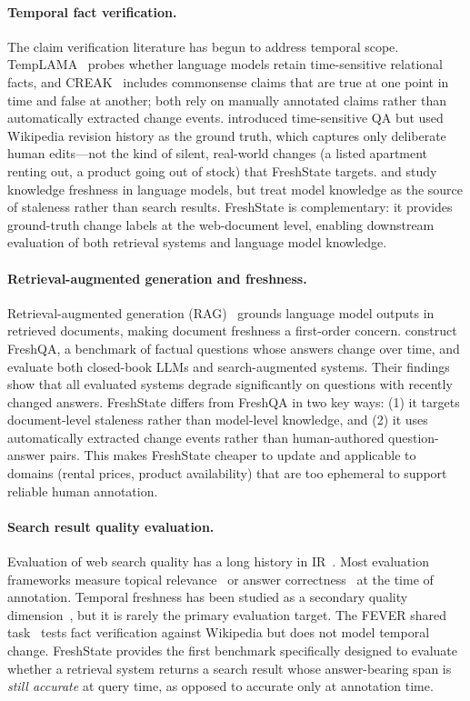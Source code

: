 \paragraph{Temporal fact verification.}
The claim verification literature has begun to address temporal scope.
TempLAMA~\citep{dhingra2022templama} probes whether language models retain
time-sensitive relational facts, and CREAK~\citep{onoe2021creak} includes commonsense
claims that are true at one point in time and false at another; both rely on manually
annotated claims rather than automatically extracted change events. \citet{chen2021timeqa}
introduced time-sensitive QA but used Wikipedia revision history as the ground
truth, which captures only deliberate human edits---not the kind of silent,
real-world changes (a listed apartment renting out, a product going out of stock)
that FreshState targets. \citet{kasner2023tabgenie} and \citet{shi2024freshllm}
study knowledge freshness in language models, but treat model knowledge as the
source of staleness rather than search results. FreshState is complementary:
it provides ground-truth change labels at the web-document level, enabling
downstream evaluation of both retrieval systems and language model knowledge.

\paragraph{Retrieval-augmented generation and freshness.}
Retrieval-augmented generation (RAG)~\citep{lewis2020rag} grounds language model
outputs in retrieved documents, making document freshness a first-order concern.
\citet{shi2024freshllm} construct FreshQA, a benchmark of factual questions whose
answers change over time, and evaluate both closed-book LLMs and search-augmented
systems. Their findings show that all evaluated systems degrade significantly on
questions with recently changed answers. FreshState differs from FreshQA in two
key ways: (1) it targets document-level staleness rather than model-level knowledge,
and (2) it uses automatically extracted change events rather than human-authored
question-answer pairs. This makes FreshState cheaper to update and applicable to
domains (rental prices, product availability) that are too ephemeral to support
reliable human annotation.

\paragraph{Search result quality evaluation.}
Evaluation of web search quality has a long history in IR~\citep{voorhees2005trec}.
Most evaluation frameworks measure topical relevance~\citep{craswell2021overview}
or answer correctness~\citep{kwiatkowski2019nq} at the time of annotation. Temporal
freshness has been studied as a secondary quality dimension~\citep{adar2009web}, but
it is rarely the primary evaluation target. The FEVER shared task~\citep{thorne2018fever}
tests fact verification against Wikipedia but does not model temporal change.
FreshState provides the first benchmark specifically designed to evaluate whether
a retrieval system returns a search result whose answer-bearing span is \emph{still
accurate} at query time, as opposed to accurate only at annotation time.
